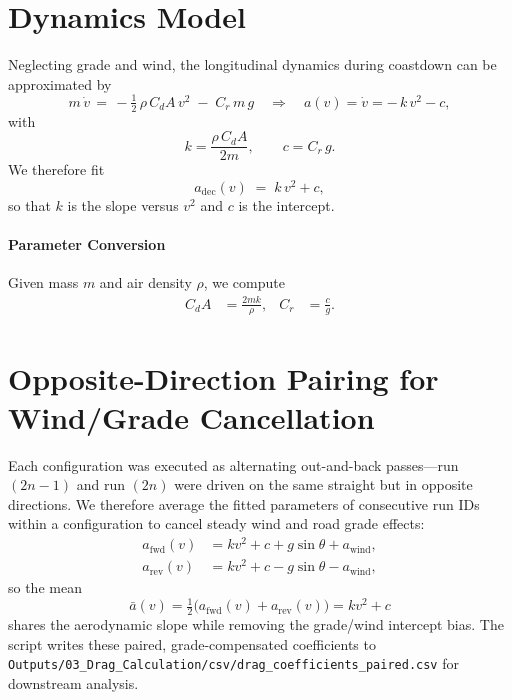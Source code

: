 \documentclass[11pt,a4paper]{article}
\begin{document}
\section{Dynamics Model}
Neglecting grade and wind, the longitudinal dynamics during coastdown can be approximated by
\begin{equation}
  m\,\dot v \,=\, -\tfrac{1}{2}\,\rho\,C_dA\,v^2\; -\; C_r\,m\,g \quad \Rightarrow \quad a(v) = \dot v = -\,k\,v^2 - c,
\end{equation}
with
\begin{equation}
  k = \frac{\rho\,C_dA}{2m}, \qquad c = C_r\,g.
\end{equation}
We therefore fit
\begin{equation}
  a_\text{dec}(v) \;=\; k\,v^2 + c,
\end{equation}
so that \(k\) is the slope versus \(v^2\) and \(c\) is the intercept.

\paragraph{Parameter Conversion}
Given mass \(m\) and air density \(\rho\), we compute
\begin{align}
  C_dA &= \frac{2 m k}{\rho}, & C_r &= \frac{c}{g}.
\end{align}

\section{Opposite-Direction Pairing for Wind/Grade Cancellation\label{sec:pairing}}
Each configuration was executed as alternating out-and-back passes---run $(2n{-}1)$ and run $(2n)$ were driven on the same straight but in opposite directions. We therefore average the fitted parameters of consecutive run IDs within a configuration to cancel steady wind and road grade effects:
\begin{align}
  a_{\text{fwd}}(v) &= k v^2 + c + g\sin\theta + a_\text{wind}, \\
  a_{\text{rev}}(v) &= k v^2 + c - g\sin\theta - a_\text{wind},
\end{align}
so the mean
\begin{equation}
  \bar a(v) = \tfrac{1}{2}\bigl(a_{\text{fwd}}(v) + a_{\text{rev}}(v)\bigr) = k v^2 + c
\end{equation}
shares the aerodynamic slope while removing the grade/wind intercept bias. The script writes these paired, grade-compensated coefficients to \texttt{Outputs/03\_Drag\_Calculation/csv/drag\_coefficients\_paired.csv} for downstream analysis.
\end{document}
